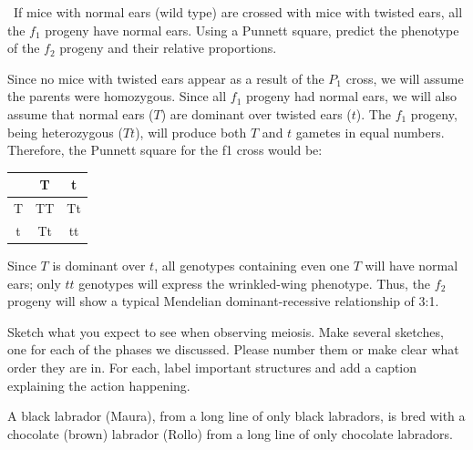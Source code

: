 \documentclass[exam,addpoints,noanswers]{exam}
\begin{document}
\begin{questions}

\clearpage
\question[23] If mice with normal ears (wild type) are crossed with mice with twisted ears, all the $f_1$ progeny have normal ears. Using a Punnett square, predict the phenotype of the $f_2$ progeny and their relative proportions.
\begin{solution}
Since no mice with twisted ears appear as a result of the $P_1$ cross, we will assume the parents were homozygous. Since all $f_1$ progeny had normal ears, we will also assume that normal ears ($T$) are dominant over twisted ears ($t$). The $f_1$ progeny, being heterozygous ($Tt$), will produce both $T$ and $t$ gametes in equal numbers. Therefore, the Punnett square for the f1 cross would be:
\begin{center}
\begin{tabular}{|c|c|c|}
\hline
& T & t \\
\hline
T & TT &Tt \\
\hline
t & Tt & tt \\
\hline
\end{tabular}
\end{center}
Since $T$ is dominant over $t$, all genotypes containing even one $T$ will have normal ears; only $tt$ genotypes will express the wrinkled-wing phenotype. Thus, the $f_2$ progeny will show a typical Mendelian dominant-recessive relationship of 3:1.
\end{solution}

\clearpage
\question[23] Sketch what you expect to see when observing meiosis. Make several sketches, one for each of the phases we discussed. Please number them or make clear what order they are in. For each, label important structures and add a caption explaining the action happening. 

\clearpage
\question A black labrador (Maura), from a long line of only black labradors, is bred with a chocolate (brown) labrador (Rollo) from a long line of only chocolate labradors. 
\begin{parts}

\end{parts}
\end{questions}
\end{document}
